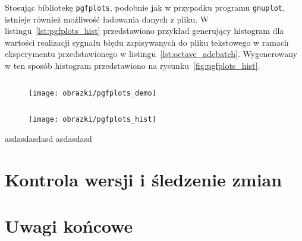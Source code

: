 Stosując bibliotekę \texttt{pgfplots}, podobnie jak w przypadku programu \texttt{gnuplot}, istnieje również możliwość ładowania danych z pliku. W listingu~\ref{lst:pgfplots_hist} przedstawiono przykład generujący histogram dla wartości realizacji sygnału błędu zapisywanych do pliku tekstowego w ramach eksperymentu przedstawionego w listingu~\ref{lst:octave_adcbatch}. Wygenerowany w ten sposób histogram przedstawiono na rysunku~\ref{fig:pgfplots_hist}.

\begin{listing}[hbt]
\inputminted{latex}{obrazki/pgfplots_demo.tex}
\end{listing}

\begin{figure}[!htb]
\texttt{[image: obrazki/pgfplots\_demo]}
\end{figure}

\begin{listing}[p]
\inputminted{latex}{obrazki/pgfplots_hist.tex}
\end{listing}

\begin{figure}[p]
\texttt{[image: obrazki/pgfplots\_hist]}
\end{figure}

asdasdasdasd
asdasdasd

\section{Kontrola wersji i śledzenie zmian}

\section{Uwagi końcowe}
